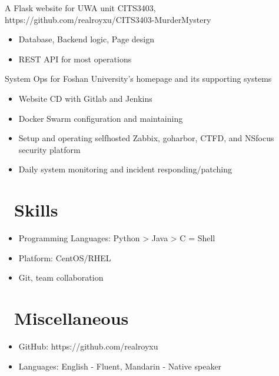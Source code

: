 \documentclass{resume}
\begin{document}
A Flask website for UWA unit CITS3403, https://github.com/realroyxu/CITS3403-MurderMystery
\begin{itemize}
  \item Database, Backend logic, Page design
  \item REST API for most operations
\end{itemize}

System Ops for Foshan University's homepage and its supporting systems
\begin{itemize}
  \item Website CD with Gitlab and Jenkins
  \item Docker Swarm configuration and maintaining
  \item Setup and operating selfhosted Zabbix, goharbor, CTFD, and NSfocus security platform
  \item Daily system monitoring and incident responding/patching
\end{itemize}


\section{\faCogs\ Skills}
\begin{itemize}[parsep=0.5ex]
  \item Programming Languages: Python > Java > C = Shell
  \item Platform: CentOS/RHEL
  \item Git, team collaboration
\end{itemize}


\section{\faInfo\ Miscellaneous}
\begin{itemize}[parsep=0.5ex]
  \item GitHub: https://github.com/realroyxu
  \item Languages: English - Fluent, Mandarin - Native speaker
\end{itemize}
\end{document}
